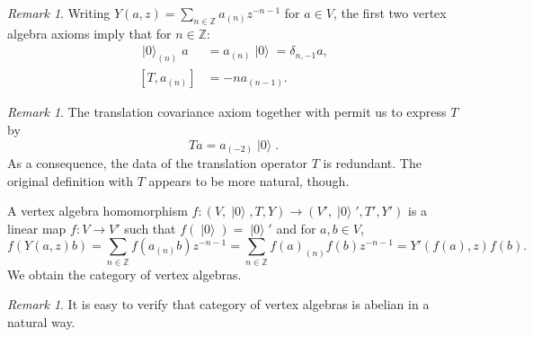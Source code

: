 \documentclass[a4paper, 12pt, reqno]{amsart}
\theoremstyle{remark}
\newtheorem{remark}[theorem]{Remark}
\numberwithin{equation}{subsection}
\DeclareMathOperator{\vac}{|0\rangle}
\begin{document}
\begin{remark}
  \label{rmk:7}
  Writing $Y(a, z) = \sum_{n \in \mathbb{Z}}a_{(n)}z^{-n - 1}$ for $a \in V$, the first two vertex algebra axioms imply that for $n \in \mathbb{Z}$:
  \begin{align*}
    \vac_{(n)}a &= a_{(n)}\vac = \delta_{n, -1}a, \\  
    [T, a_{(n)}] &= -na_{(n - 1)}.
  \end{align*}
\end{remark}

\begin{remark}
  \label{rmk:8}
  The translation covariance axiom together with  permit us to express $T$ by
  \begin{equation}
    \label{eq:13}
    Ta = a_{(-2)}\vac.
  \end{equation}
  As a consequence, the data of the translation operator $T$ is redundant.
  The original definition with $T$ appears to be more natural, though.
\end{remark}

A vertex algebra homomorphism $f: (V, \vac, T, Y) \to (V', \vac', T', Y')$ is a linear map $f: V \to V'$ such that $f(\vac) = \vac'$ and for $a, b \in V$,
\begin{equation*}
  f(Y(a, z)b) = \sum_{n \in \mathbb{Z}}f(a_{(n)}b)z^{-n - 1} = \sum_{n \in \mathbb{Z}}f(a)_{(n)}f(b)z^{-n - 1} = Y'(f(a), z)f(b).
\end{equation*}
We obtain the category of vertex algebras.

\begin{remark}
  \label{rmk:9}
  It is easy to verify that category of vertex algebras is abelian in a natural way.
\end{remark}
\end{document}
